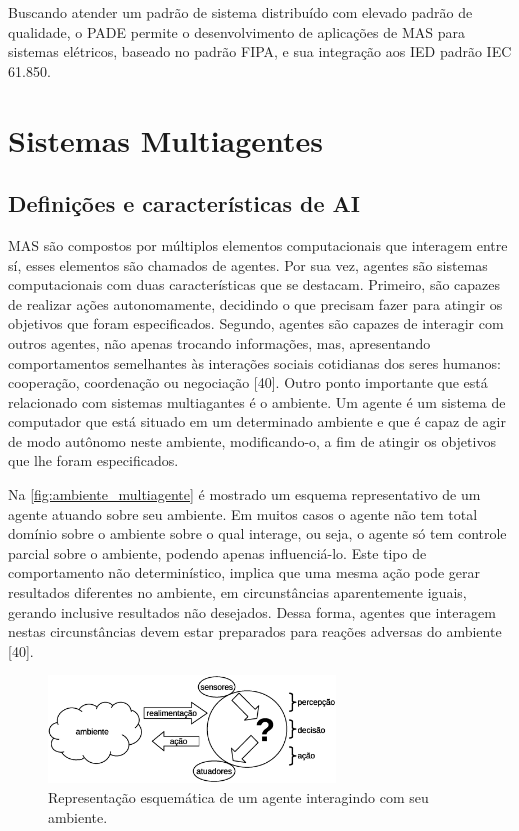 \documentclass[journal]{IEEEtran}
\begin{document}
Buscando atender um padrão de sistema distribuído com elevado padrão de qualidade, o PADE permite o desenvolvimento de aplicações de MAS para sistemas elétricos, baseado no padrão FIPA, e sua integração aos IED padrão IEC 61.850. 

\section{Sistemas Multiagentes}

\subsection{Definições e características de AI}

MAS são compostos por múltiplos elementos computacionais que interagem entre sí, esses elementos são chamados de agentes. Por sua vez, agentes são sistemas computacionais com duas características que se destacam. Primeiro, são capazes de realizar ações autonomamente, decidindo o que precisam fazer para atingir os objetivos que foram especificados. Segundo, agentes são capazes de interagir com outros agentes, não apenas trocando informações, mas, apresentando comportamentos semelhantes às interações sociais cotidianas dos seres humanos: cooperação, coordenação ou negociação [40].
Outro ponto importante que está relacionado com sistemas multiagantes é o ambiente. Um agente é um sistema de computador que está situado em um determinado ambiente e que é capaz de agir de modo autônomo neste ambiente, modificando-o, a fim de atingir os objetivos que lhe foram especificados.

Na \autoref{fig:ambiente_multiagente} é mostrado um esquema representativo de um agente atuando sobre seu ambiente. Em muitos casos o agente não tem total domínio sobre o ambiente sobre o qual interage, ou seja, o agente só tem controle parcial sobre o ambiente, podendo apenas influenciá-lo. Este tipo de comportamento não determinístico, implica que uma mesma ação pode gerar resultados diferentes no ambiente, em circunstâncias aparentemente iguais, gerando inclusive resultados não desejados. Dessa forma, agentes que interagem nestas circunstâncias devem estar preparados para reações adversas do ambiente [40].

\begin{figure}[htb]
    \centering
    \includegraphics[width=3.0in]{Figuras/ambiente_agente.eps}
    \caption{\label{fig:ambiente_multiagente}Representação esquemática de um agente interagindo com seu ambiente.}
\end{figure}
\end{document}
